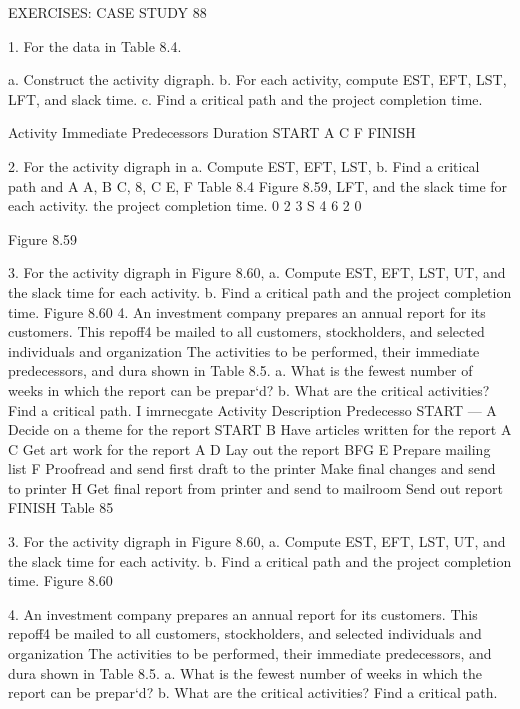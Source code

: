 EXERCISES: CASE STUDY 88 

1. For the data in Table 8.4. 

a. Construct the activity digraph. 
b. For each activity, compute EST, EFT, LST, LFT, and slack time. 
c. Find a critical path and the project completion time. 

Activity Immediate Predecessors Duration START A C F FINISH 

2. For the activity digraph in a. Compute EST, EFT, LST, b. Find a critical path and 
A A, B C, 8, C E, F 
Table 8.4 
Figure 8.59, LFT, and the slack time for each activity. the project completion time. 
0 2 3 S 4 6 2 0 

Figure 8.59 



3. For the activity digraph in Figure 8.60, 
a. Compute EST, EFT, LST, UT, and the slack time for each activity. 
b. Find a critical path and the project completion time. 
Figure 8.60 
4. An investment company prepares an annual report for its customers. This repoff4 
be mailed to all customers, stockholders, and selected individuals and organization 
The activities to be performed, their immediate predecessors, and dura 
shown in Table 8.5. 
a. What is the fewest number of weeks in which the report can be prepar‘d? 
b. What are the critical activities? Find a critical path. 
I 
imrnecgate 
Activity Description Predecesso 
START — 
A Decide on a theme for the report START 
B Have articles written for the report A 
C Get art work for the report A 
D Lay out the report BFG 
E Prepare mailing list 
F Proofread and send first draft to the printer 
Make final changes and send to printer 
H Get final report from printer and send to mailroom 
Send out report 
FINISH 
Table 85 



3. For the activity digraph in Figure 8.60, a. Compute EST, EFT, LST, UT, and the slack time for each activity. b. Find a critical path and the project completion time. 
Figure 8.60 

4. An investment company prepares an annual report for its customers. This repoff4 be mailed to all customers, stockholders, and selected individuals and organization The activities to be performed, their immediate predecessors, and dura shown in Table 8.5. a. What is the fewest number of weeks in which the report can be prepar‘d? b. What are the critical activities? Find a critical path. 

